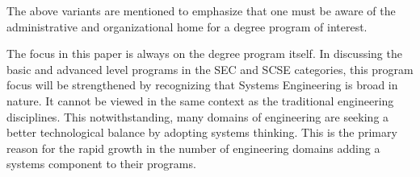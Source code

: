 The above variants are mentioned to emphasize that one must be aware of the administrative and organizational home for a degree program of interest.

The focus in this paper is always on the degree program itself. In discussing the basic and advanced level programs in the SEC and SCSE categories, this program focus will be strengthened by recognizing that Systems Engineering is broad in nature. It cannot be viewed in the same context as the traditional engineering disciplines. This notwithstanding, many domains of engineering are seeking a better technological balance by adopting systems thinking. This is the primary reason for the rapid growth in the number of engineering domains adding a systems component to their programs.
